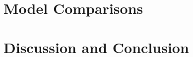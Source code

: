 \documentclass[twocolumn]{aastex631}
\begin{document}
\section{Model Comparisons} \label{sec:model}

\section{Discussion and Conclusion} \label{sec:discussion}

{}



\end{document}
